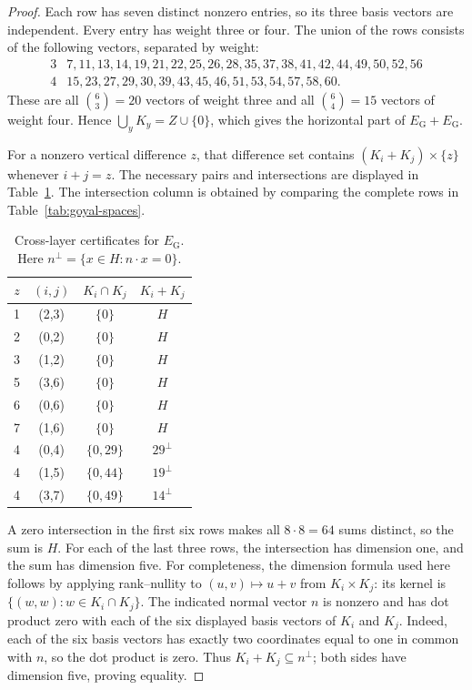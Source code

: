 \documentclass[11pt]{article}
\numberwithin{equation}{section}
\theoremstyle{definition}
\theoremstyle{remark}\newtheorem{remark}[theorem]{Remark}
\begin{document}
\begin{proof}
Each row has seven distinct nonzero entries, so its three basis vectors
are independent. Every entry has weight three or four. The union of the
rows consists of the following vectors, separated by weight:
\[
\begin{array}{c|l}
3&7,11,13,14,19,21,22,25,26,28,35,37,38,41,42,44,49,50,52,56\\
4&15,23,27,29,30,39,43,45,46,51,53,54,57,58,60.
\end{array}
\]
These are all $\binom63=20$ vectors of weight three and all
$\binom64=15$ vectors of weight four. Hence
$\bigcup_yK_y=Z\cup\{0\}$, which gives the horizontal part of
$E_{\mathrm G}+E_{\mathrm G}$.

For a nonzero vertical difference $z$, that difference set contains
$(K_i+K_j)\times\{z\}$ whenever $i+j=z$. The necessary pairs and
intersections are displayed in Table~\ref{tab:goyal-cross}.
The intersection column is obtained by comparing the complete rows
in Table~\ref{tab:goyal-spaces}.

\begin{table}[htbp]
\centering
\begin{tabular}{cccc}
\toprule
$z$&$(i,j)$&$K_i\cap K_j$&$K_i+K_j$\\\midrule
1&(2,3)&$\{0\}$&$H$\\
2&(0,2)&$\{0\}$&$H$\\
3&(1,2)&$\{0\}$&$H$\\
5&(3,6)&$\{0\}$&$H$\\
6&(0,6)&$\{0\}$&$H$\\
7&(1,6)&$\{0\}$&$H$\\\midrule
4&(0,4)&$\{0,29\}$&$29^\perp$\\
4&(1,5)&$\{0,44\}$&$19^\perp$\\
4&(3,7)&$\{0,49\}$&$14^\perp$\\\bottomrule
\end{tabular}
\caption{Cross-layer certificates for $E_{\mathrm G}$. Here
$n^\perp=\{x\in H:n\cdot x=0\}$.}\label{tab:goyal-cross}
\end{table}

A zero intersection in the first six rows makes all $8\cdot8=64$
sums distinct, so the sum is $H$. For each of the last three rows,
the intersection has dimension one, and the sum has dimension five.
For completeness, the dimension formula used here follows by applying
rank--nullity to $(u,v)\mapsto u+v$ from $K_i\times K_j$: its kernel
is $\{(w,w):w\in K_i\cap K_j\}$. The indicated normal vector $n$
is nonzero and has dot product zero with each of the six displayed
basis vectors of $K_i$ and $K_j$. Indeed, each of the six basis vectors has exactly two coordinates
equal to one in common with $n$, so the dot product is zero. Thus $K_i+K_j\subseteq n^\perp$;
both sides have dimension five, proving equality.


\end{proof}
\end{document}
